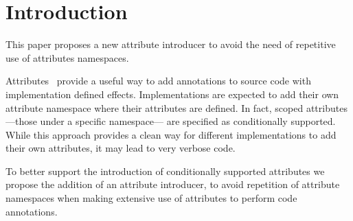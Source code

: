 \section{Introduction}

This paper proposes a new attribute introducer to 
avoid the need of repetitive use of attributes namespaces.

Attributes~\cite{n2761} provide a useful way to add annotations to source code
with implementation defined effects. Implementations are expected to add their
own attribute namespace where their attributes are defined. In fact, scoped
attributes ---those under a specific namespace--- are specified as
conditionally supported. While this approach provides a clean way for different
implementations to add their own attributes, it may lead to very verbose code.

To better support the introduction of conditionally supported attributes we
propose the addition of an attribute introducer, to avoid repetition of
attribute namespaces when making extensive use of attributes to perform code
annotations.
